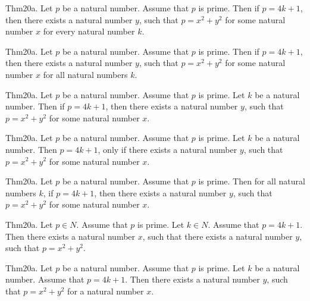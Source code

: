 \documentclass{article}
\begin{document}
Thm20a. Let $p$ be a natural number. Assume that $p$ is prime. Then if $p = 4 k + 1$, then there exists a natural number $y$, such that $p = x ^{ 2}+ y ^{ 2}$ for some natural number $x$ for every natural number $k$.

Thm20a. Let $p$ be a natural number. Assume that $p$ is prime. Then if $p = 4 k + 1$, then there exists a natural number $y$, such that $p = x ^{ 2}+ y ^{ 2}$ for some natural number $x$ for all natural numbers $k$.

Thm20a. Let $p$ be a natural number. Assume that $p$ is prime. Let $k$ be a natural number. Then if $p = 4 k + 1$, then there exists a natural number $y$, such that $p = x ^{ 2}+ y ^{ 2}$ for some natural number $x$.

Thm20a. Let $p$ be a natural number. Assume that $p$ is prime. Let $k$ be a natural number. Then $p = 4 k + 1$, only if there exists a natural number $y$, such that $p = x ^{ 2}+ y ^{ 2}$ for some natural number $x$.

Thm20a. Let $p$ be a natural number. Assume that $p$ is prime. Then for all natural numbers $k$, if $p = 4 k + 1$, then there exists a natural number $y$, such that $p = x ^{ 2}+ y ^{ 2}$ for some natural number $x$.

Thm20a. Let $p \in N$. Assume that $p$ is prime. Let $k \in N$. Assume that $p = 4 k + 1$. Then there exists a natural number $x$, such that there exists a natural number $y$, such that $p = x ^{ 2}+ y ^{ 2}$.

Thm20a. Let $p$ be a natural number. Assume that $p$ is prime. Let $k$ be a natural number. Assume that $p = 4 k + 1$. Then there exists a natural number $y$, such that $p = x ^{ 2}+ y ^{ 2}$ for a natural number $x$.
\end{document}
